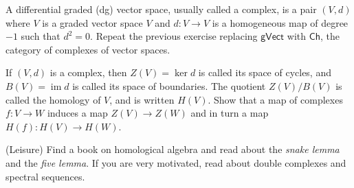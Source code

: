 \begin{question} A differential graded (dg) vector space,
usually called a complex, is a pair $(V,d)$ where $V$ is 
a graded vector space $V$ and $d: V \to V$ is a homogeneous
map of degree $-1$ such that $d^2=0$. Repeat the previous
exercise replacing $\mathsf{gVect}$ with $\mathsf{Ch}$,
the category of complexes of vector spaces.
\end{question}

\begin{question} If $(V,d)$ is a complex, then $Z(V) = \ker d$ 
is called its space of cycles, and $B(V) = \operatorname{im} d$ 
is called
its space of boundaries. The quotient $Z(V)/B(V)$ is called
the homology of $V$, and is written $H(V)$. Show that a map 
of complexes $f:V\to W$ induces a map $Z(V) \to Z(W)$ and 
in turn a map $H(f) : H(V) \to H(W)$. 
\end{question}
 
\begin{question} (Leisure) Find a book on homological algebra
and read about the \emph{snake lemma} and the \emph{five lemma}.
If you are very motivated, read about double complexes and spectral
sequences.
\end{question}